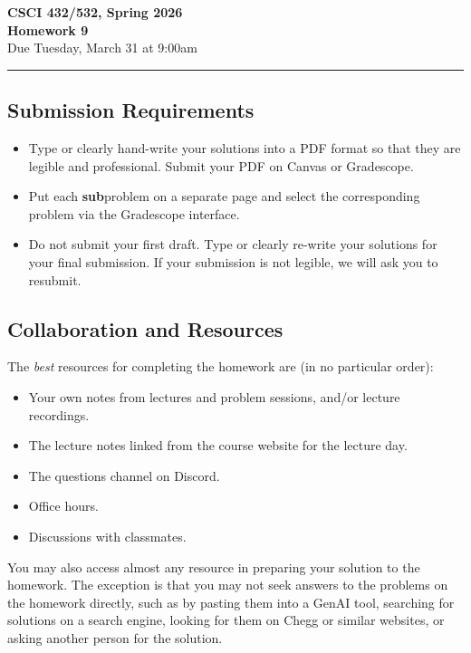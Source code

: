 \documentclass[11pt]{article}
\begin{document}
\begin{center}
\Large\textbf{CSCI 432/532, Spring 2026}%
\\
\LARGE\textbf{Homework 9}%
\\[0.5ex]
\large Due Tuesday, March 31 at 9:00am
\end{center}

\bigskip
\hrule
\bigskip

\subsection*{Submission Requirements}
\begin{itemize}
    \item Type or clearly hand-write your solutions into a PDF format so that they are legible and professional. Submit your PDF on Canvas or Gradescope. 
	\item Put each \textbf{sub}problem on a separate page and select the corresponding problem via the Gradescope interface.
    \item Do not submit your first draft. Type or clearly re-write your solutions for your final submission. If your submission is not legible, we will ask you to resubmit.
\end{itemize}

\subsection*{Collaboration and Resources}

The \emph{best} resources for completing the homework are (in no particular order):
\begin{itemize}
	\item Your own notes from lectures and problem sessions, and/or lecture recordings.
	\item The lecture notes linked from the course website for the lecture day.
	\item The questions channel on Discord.
	\item Office hours.
	\item Discussions with classmates.
\end{itemize}
You may also access almost any resource in preparing your solution to the
homework. The exception is that you may not seek answers to the problems on the
homework directly, such as by pasting them into a GenAI tool, searching for
solutions on a search engine, looking for them on Chegg or similar websites, or
asking another person for the solution.
\end{document}
